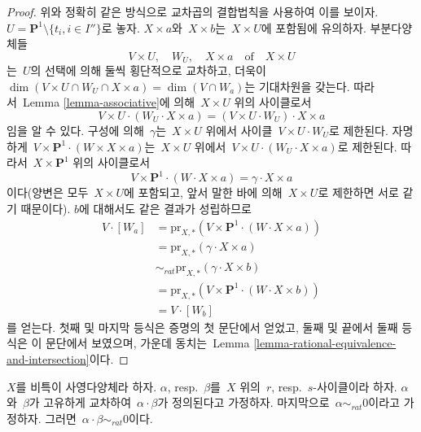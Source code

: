 \begin{proof}
\medskip\noindent
위와 정확히 같은 방식으로 교차곱의 결합법칙을 사용하여 이를 보이자.
$U = \mathbf{P}^1 \setminus \{t_i, i \in I''\}$로 놓자.
$X \times a$와\  $X \times b$는\  $X \times U$에 포함됨에 유의하자.
부분다양체들
$$
V \times U,\quad W_U,\quad X \times a\quad\text{of}\quad X \times U
$$
는\  $U$의 선택에 의해 둘씩 횡단적으로 교차하고, 더욱이\ 
$\dim(V \times U \cap W_U \cap X \times a) = \dim(V \cap W_a)$는
기대차원을 갖는다. 따라서\  Lemma \ref{lemma-associative}에 의해\ 
$X \times U$ 위의 사이클로서
$$
V \times U \cdot (W_U \cdot X \times a) =
(V \times U \cdot W_U) \cdot X \times a
$$
임을 알 수 있다. 구성에 의해\  $\gamma$는\  $X \times U$ 위에서
사이클\  $V \times U \cdot W_U$로 제한된다. 자명하게\ 
$V \times \mathbf{P}^1 \cdot (W \times X \times a)$는\ 
$X \times U$ 위에서\  $V \times U \cdot (W_U \cdot X \times a)$로
제한된다. 따라서\  $X \times \mathbf{P}^1$ 위의 사이클로서
$$
V \times \mathbf{P}^1 \cdot (W \cdot X \times a) =
\gamma \cdot X \times a
$$
이다(양변은 모두\  $X \times U$에 포함되고, 앞서 말한 바에 의해\ 
$X \times U$로 제한하면 서로 같기 때문이다). $b$에 대해서도
같은 결과가 성립하므로
\begin{align*}
V \cdot [W_a]
& =
\text{pr}_{X,*}(V \times \mathbf{P}^1 \cdot (W \cdot X\times a)) \\
& =
\text{pr}_{X, *}(\gamma \cdot X \times a) \\
& \sim_{rat} 
\text{pr}_{X, *}(\gamma \cdot X \times b) \\
& =
\text{pr}_{X,*}(V \times \mathbf{P}^1 \cdot (W \cdot X\times b)) \\
& =
V \cdot [W_b]
\end{align*}
를 얻는다. 첫째 및 마지막 등식은 증명의 첫 문단에서 얻었고,
둘째 및 끝에서 둘째 등식은 이 문단에서 보였으며, 가운데 동치는\ 
Lemma \ref{lemma-rational-equivalence-and-intersection}이다.
\end{proof}

\begin{theorem}
\label{theorem-well-defined}
$X$를 비특이 사영다양체라 하자. $\alpha$, resp.\ $\beta$를\ 
$X$ 위의\  $r$, resp.\ $s$-사이클이라 하자.
$\alpha$와\  $\beta$가 고유하게 교차하여\ 
$\alpha \cdot \beta$가 정의된다고 가정하자. 마지막으로\ 
$\alpha \sim_{rat} 0$이라고 가정하자. 그러면\ 
$\alpha \cdot \beta \sim_{rat} 0$이다.
\end{theorem}

